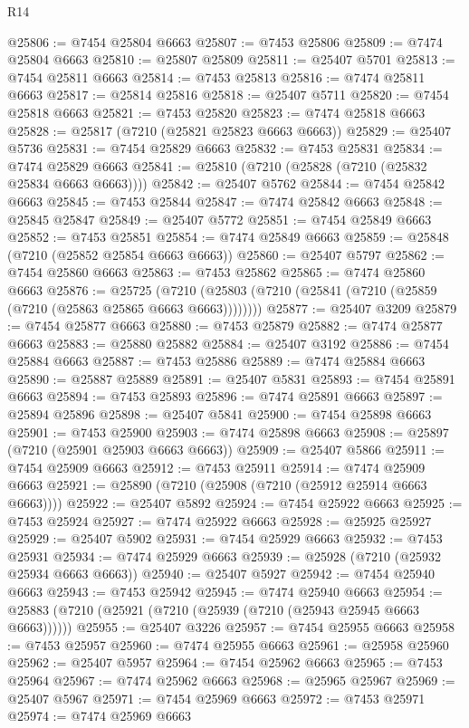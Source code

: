 \begin{lexlean}{R14}
\begin{coremodule}
@25806 := @7454 @25804 @6663
@25807 := @7453 @25806
@25809 := @7474 @25804 @6663
@25810 := @25807 @25809
@25811 := @25407 @5701
@25813 := @7454 @25811 @6663
@25814 := @7453 @25813
@25816 := @7474 @25811 @6663
@25817 := @25814 @25816
@25818 := @25407 @5711
@25820 := @7454 @25818 @6663
@25821 := @7453 @25820
@25823 := @7474 @25818 @6663
@25828 := @25817 (@7210 (@25821 @25823 @6663 @6663))
@25829 := @25407 @5736
@25831 := @7454 @25829 @6663
@25832 := @7453 @25831
@25834 := @7474 @25829 @6663
@25841 := @25810 (@7210 (@25828 (@7210 (@25832 @25834 @6663 @6663))))
@25842 := @25407 @5762
@25844 := @7454 @25842 @6663
@25845 := @7453 @25844
@25847 := @7474 @25842 @6663
@25848 := @25845 @25847
@25849 := @25407 @5772
@25851 := @7454 @25849 @6663
@25852 := @7453 @25851
@25854 := @7474 @25849 @6663
@25859 := @25848 (@7210 (@25852 @25854 @6663 @6663))
@25860 := @25407 @5797
@25862 := @7454 @25860 @6663
@25863 := @7453 @25862
@25865 := @7474 @25860 @6663
@25876 := @25725
    (@7210 (@25803 (@7210 (@25841 (@7210 (@25859 (@7210 (@25863 @25865 @6663 @6663))))))))
@25877 := @25407 @3209
@25879 := @7454 @25877 @6663
@25880 := @7453 @25879
@25882 := @7474 @25877 @6663
@25883 := @25880 @25882
@25884 := @25407 @3192
@25886 := @7454 @25884 @6663
@25887 := @7453 @25886
@25889 := @7474 @25884 @6663
@25890 := @25887 @25889
@25891 := @25407 @5831
@25893 := @7454 @25891 @6663
@25894 := @7453 @25893
@25896 := @7474 @25891 @6663
@25897 := @25894 @25896
@25898 := @25407 @5841
@25900 := @7454 @25898 @6663
@25901 := @7453 @25900
@25903 := @7474 @25898 @6663
@25908 := @25897 (@7210 (@25901 @25903 @6663 @6663))
@25909 := @25407 @5866
@25911 := @7454 @25909 @6663
@25912 := @7453 @25911
@25914 := @7474 @25909 @6663
@25921 := @25890 (@7210 (@25908 (@7210 (@25912 @25914 @6663 @6663))))
@25922 := @25407 @5892
@25924 := @7454 @25922 @6663
@25925 := @7453 @25924
@25927 := @7474 @25922 @6663
@25928 := @25925 @25927
@25929 := @25407 @5902
@25931 := @7454 @25929 @6663
@25932 := @7453 @25931
@25934 := @7474 @25929 @6663
@25939 := @25928 (@7210 (@25932 @25934 @6663 @6663))
@25940 := @25407 @5927
@25942 := @7454 @25940 @6663
@25943 := @7453 @25942
@25945 := @7474 @25940 @6663
@25954 := @25883 (@7210 (@25921 (@7210 (@25939 (@7210 (@25943 @25945 @6663 @6663))))))
@25955 := @25407 @3226
@25957 := @7454 @25955 @6663
@25958 := @7453 @25957
@25960 := @7474 @25955 @6663
@25961 := @25958 @25960
@25962 := @25407 @5957
@25964 := @7454 @25962 @6663
@25965 := @7453 @25964
@25967 := @7474 @25962 @6663
@25968 := @25965 @25967
@25969 := @25407 @5967
@25971 := @7454 @25969 @6663
@25972 := @7453 @25971
@25974 := @7474 @25969 @6663

\end{coremodule}
\end{lexlean}
